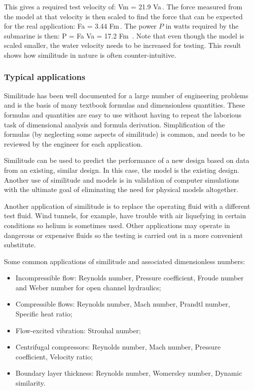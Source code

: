 This gives a required test velocity of:
\beq
V\txt m = 21.9 V\txt a\,.
\eeq
The force measured from the model at that velocity is then scaled to find the force that can be expected for the real application:
\beq
F\txt a = 3.44 F\txt m\,.
\eeq
The power $P$ in watts required by the submarine is then:
\beq
P = F\txt a V\txt a = 17.2 F\txt m \,.
\eeq
Note that even though the model is scaled smaller, the water velocity needs to be increased for testing. This result shows how similitude in nature is often counter-intuitive.


\subsubsection{Typical applications}
Similitude has been well documented for a large number of engineering problems and is the basis of many textbook formulas and dimensionless quantities. These formulas and quantities are easy to use without having to repeat the laborious task of dimensional analysis and formula derivation. Simplification of the formulas (by neglecting some aspects of similitude) is common, and needs to be reviewed by the engineer for each application.

Similitude can be used to predict the performance of a new design based on data from an existing, similar design. In this case, the model is the existing design. Another use of similitude and models is in validation of computer simulations with the ultimate goal of eliminating the need for physical models altogether.

Another application of similitude is to replace the operating fluid with a different test fluid. Wind tunnels, for example, have trouble with air liquefying in certain conditions so helium is sometimes used. Other applications may operate in dangerous or expensive fluids so the testing is carried out in a more convenient substitute.

Some common applications of similitude and associated dimensionless numbers:
\begin{itemize}
\item Incompressible flow: Reynolds number, Pressure coefficient, Froude number and Weber number for open channel hydraulics;
%
\item Compressible flows: Reynolds number, Mach number, Prandtl number, Specific heat ratio;
%
\item Flow-excited vibration: Strouhal number;
%
\item Centrifugal compressors: Reynolds number, Mach number, Pressure coefficient, Velocity ratio;
%
\item Boundary layer thickness: Reynolds number, Womersley number, Dynamic similarity.
\end{itemize}


